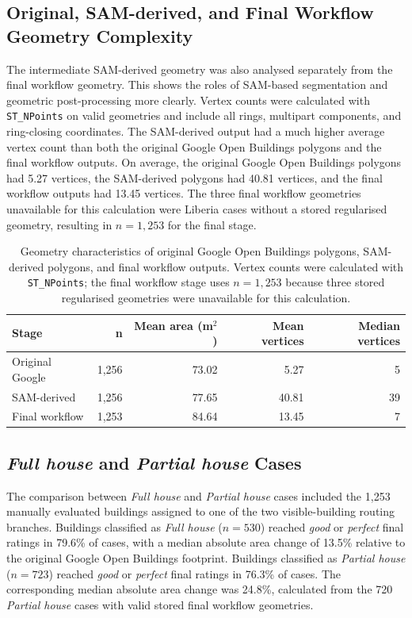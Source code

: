 \subsection{Original, SAM-derived, and Final Workflow Geometry Complexity}

The intermediate SAM-derived geometry was also analysed separately from the final workflow geometry. This shows the roles of SAM-based segmentation and geometric post-processing more clearly. Vertex counts were calculated with \texttt{ST\_NPoints} on valid geometries and include all rings, multipart components, and ring-closing coordinates. The SAM-derived output had a much higher average vertex count than both the original Google Open Buildings polygons and the final workflow outputs. On average, the original Google Open Buildings polygons had 5.27 vertices, the SAM-derived polygons had 40.81 vertices, and the final workflow outputs had 13.45 vertices. The three final workflow geometries unavailable for this calculation were Liberia cases without a stored regularised geometry, resulting in \(n=1,253\) for the final stage.

\begin{table}[htb]
\centering
\caption{Geometry characteristics of original Google Open Buildings polygons, SAM-derived polygons, and final workflow outputs. Vertex counts were calculated with \texttt{ST\_NPoints}; the final workflow stage uses \(n=1,253\) because three stored regularised geometries were unavailable for this calculation.}
\label{tab:stage_geometry_comparison}
\begin{tabular}{lrrrr}
\toprule
Stage & n & Mean area (m$^2$) & Mean vertices & Median vertices \\
\midrule
Original Google & 1,256 & 73.02 & 5.27  & 5 \\
SAM-derived     & 1,256 & 77.65 & 40.81 & 39 \\
Final workflow  & 1,253 & 84.64 & 13.45 & 7 \\
\bottomrule
\end{tabular}
\end{table}

\subsection{\textit{Full house} and \textit{Partial house} Cases}
\label{sec:results_full_partial_cases}

The comparison between \textit{Full house} and \textit{Partial house} cases included the 1,253 manually evaluated buildings assigned to one of the two visible-building routing branches. Buildings classified as \textit{Full house} (\(n=530\)) reached \textit{good} or \textit{perfect} final ratings in 79.6\% of cases, with a median absolute area change of 13.5\% relative to the original Google Open Buildings footprint. Buildings classified as \textit{Partial house} (\(n=723\)) reached \textit{good} or \textit{perfect} final ratings in 76.3\% of cases. The corresponding median absolute area change was 24.8\%, calculated from the 720 \textit{Partial house} cases with valid stored final workflow geometries.


